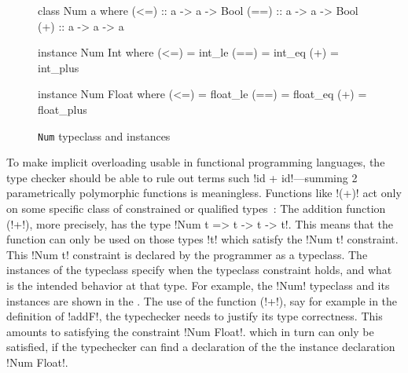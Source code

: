 \documentclass[screen,nonacm,manuscript,review]{acmart} %
\begin{document}
\begin{figure}[ht]
\centering
\begin{minipage}[ht]{0.3\linewidth}
\begin{CenteredBox}
\begin{code}
class Num a where
  (<=) :: a -> a -> Bool
  (==) :: a -> a -> Bool
  (+) :: a -> a -> a
\end{code}
\end{CenteredBox}
\end{minipage}%
\begin{minipage}[ht]{0.3\linewidth}
\begin{CenteredBox}
\begin{code}
instance Num Int where
  (<=) = int_le
  (==) = int_eq
  (+) = int_plus
\end{code}
\end{CenteredBox}
\end{minipage}%
\begin{minipage}[ht]{0.3\linewidth}
\begin{CenteredBox}
\begin{code}
instance Num Float where
  (<=) = float_le
  (==) = float_eq
  (+) = float_plus
\end{code}
\end{CenteredBox}
\end{minipage}
\caption{\lstinline{Num} typeclass and instances}
\label{fig:tc-num}
\end{figure}

To make implicit overloading usable in functional programming
languages, the type checker should be able to rule out terms such
!id + id!---summing 2 parametrically polymorphic functions is meaningless.
Functions like !(+)! act only on some specific class of constrained or qualified
types~\cite{jones_qualified_1994}:  The addition function
(!+!), more precisely, has the type !Num t => t -> t -> t!. This means that the
function can only be used on those types !t! which satisfy the !Num t!
constraint. This !Num t! constraint is declared by the programmer as a
typeclass. The instances of the typeclass specify when the typeclass
constraint holds, and what is the intended behavior at that type. For
example, the !Num! typeclass and its instances are shown in the
. The use of the function (!+!), say for
example in the definition of !addF!, the typechecker needs to justify
its type correctness. This amounts to satisfying the constraint !Num Float!.
which in turn can only be satisfied, if the typechecker can find a declaration of the
the instance declaration !Num Float!.
\end{document}
